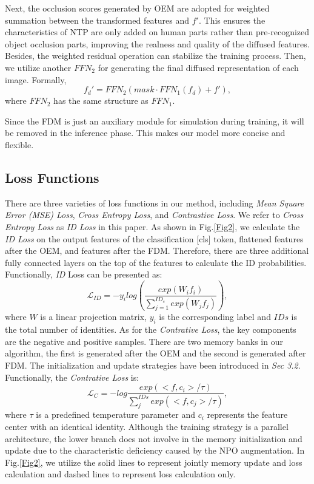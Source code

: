 \documentclass[10pt,twocolumn,letterpaper]{article}
\begin{document}
Next, the occlusion scores generated by OEM are adopted for weighted summation between the transformed features and $f'$. 
This ensures the characteristics of NTP are only added on human parts rather than pre-recognized object occlusion parts, improving the realness and quality of the diffused features. Besides, the weighted residual operation can stabilize the training process. 
Then, we utilize another $FFN_2$ \cite{xiong2020layer} for generating the final diffused representation of each image. 
Formally,
\begin{equation}
    f_{d}' = FFN_2(mask \cdot FFN_1(f_{d}) + f'),
\end{equation}
where $FFN_2$ has the same structure as $FFN_1$.

Since the FDM is just an auxiliary module for simulation during training, it will be removed in the inference phase. This makes our model more concise and flexible. 











\subsection{Loss Functions}
There are three varieties of loss functions in our method, including \emph{Mean Square Error (MSE) Loss}, \emph{Cross Entropy Loss}, and \emph{Contrastive Loss}. We refer to \emph{Cross Entropy Loss} as \emph{ID Loss} in this paper. As shown in Fig.\ref{Fig2}, we calculate the \emph{ID Loss} on the output features of the classification [cls] token, flattened features after the OEM, and features after the FDM. Therefore, there are three additional fully connected layers on the top of the features to calculate the ID probabilities. 
Functionally, \emph{ID} Loss can be presented as:
\begin{equation}
    \mathcal{L}_{ID}=-y_ilog(\frac{exp(W_if_i)}{\sum_{j=1}^{ID_s}exp(W_jf_j)}),
\end{equation}
where $W$ is a linear projection matrix, $y_i$ is the corresponding label and $IDs$ is the total number of identities. 
As for the \emph{Contrative Loss}, the key components are the negative and positive samples. There are two memory banks in our algorithm, the first is generated after the OEM and the second is generated after FDM. The initialization and update strategies have been introduced in \emph{Sec 3.2}. 
Functionally, the \emph{Contrative Loss} is:
\begin{equation}
    \mathcal{L}_{C}=-log\frac{exp(<f,c_i>/\tau )}{\sum_{j}^{IDs}exp(<f,c_j>/\tau)},
\end{equation}
where $\tau$ is a predefined temperature parameter and $c_i$ represents the feature center with an identical identity. 
Although the training strategy is a parallel architecture, the lower branch does not involve in the memory initialization and update due to the characteristic deficiency caused by the NPO augmentation. In Fig.\ref{Fig2}, we utilize the solid lines to represent jointly memory update and loss calculation and dashed lines to represent loss calculation only. 
\end{document}
